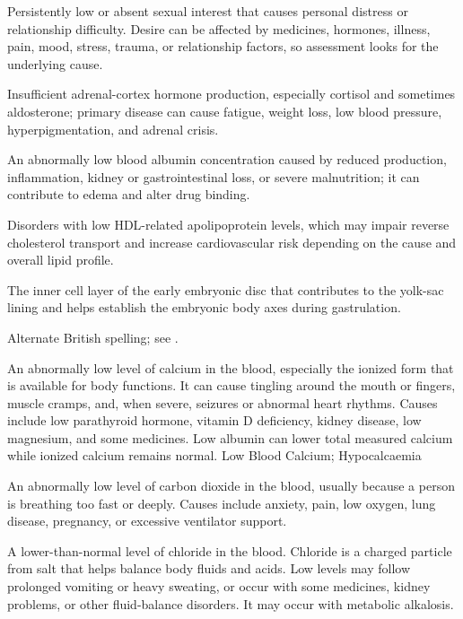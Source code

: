  Persistently low or absent sexual interest that causes personal distress or relationship difficulty. Desire can be affected by medicines, hormones, illness, pain, mood, stress, trauma, or relationship factors, so assessment looks for the underlying cause.

 Insufficient adrenal-cortex hormone production, especially cortisol and sometimes aldosterone; primary disease can cause fatigue, weight loss, low blood pressure, hyperpigmentation, and adrenal crisis.

 An abnormally low blood albumin concentration caused by reduced production, inflammation, kidney or gastrointestinal loss, or severe malnutrition; it can contribute to edema and alter drug binding.

 Disorders with low HDL-related apolipoprotein levels, which may impair reverse cholesterol transport and increase cardiovascular risk depending on the cause and overall lipid profile.

 The inner cell layer of the early embryonic disc that contributes to the yolk-sac lining and helps establish the embryonic body axes during gastrulation.

 Alternate British spelling; see .

 An abnormally low level of calcium in the blood, especially the ionized form that is available for body functions. It can cause tingling around the mouth or fingers, muscle cramps, and, when severe, seizures or abnormal heart rhythms. Causes include low parathyroid hormone, vitamin D deficiency, kidney disease, low magnesium, and some medicines. Low albumin can lower total measured calcium while ionized calcium remains normal.
\synonyms
Low Blood Calcium; Hypocalcaemia

 An abnormally low level of carbon dioxide in the blood, usually because a person is breathing too fast or deeply. Causes include anxiety, pain, low oxygen, lung disease, pregnancy, or excessive ventilator support.

 A lower-than-normal level of chloride in the blood. Chloride is a charged
particle from salt that helps balance body fluids and acids. Low levels may follow prolonged
vomiting or heavy sweating, or occur with some medicines, kidney problems, or other
fluid-balance disorders. It may occur with metabolic alkalosis.

